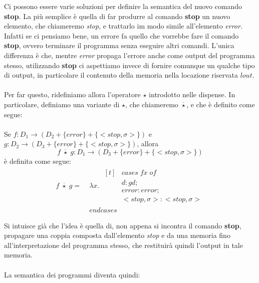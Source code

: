     Ci possono essere varie soluzioni per definire la semantica del nuovo comando \textbf{stop}. La più semplice è quella di far produrre al comando \textbf{stop} un nuovo elemento, che chiameremo \textit{stop}, e trattarlo im modo simile all'elemento \textit{error}. Infatti se ci pensiamo bene, un errore fa quello che vorrebbe fare il comando \textbf{stop}, ovvero terminare il programma senza eseguire altri comandi. L'unica differenza è che, mentre \textit{error} propaga l'errore anche come output del programma stesso, utilizzando \textbf{stop} ci aspettiamo invece di fornire comunque un qualche tipo di output, in particolare il contenuto della memoria nella locazione riservata $lout$.\\
    \\
    Per far questo, ridefiniamo allora l'operatore $\star$ introdotto nelle dispense. In particolare, definiamo una variante di $\star$, che chiameremo $\overline{\star}$, e che è definito come segue:\\
    \\
    Se $f : D_1 \rightarrow (D_2 + \{error\} + \{<stop, \sigma>\})$ e $g : D_2 \rightarrow (D_3 + \{error\} + \{<stop, \sigma>\})$, allora
    \begin{equation*}
        f\; \overline{\star}\; g : D_1 \rightarrow (D_3 + \{error\} + \{<stop, \sigma>\})
    \end{equation*}
    è definita come segue:
    \begin{align*}
        f\; \overline{\star}\; g =\; &\lambda x.\; \begin{aligned}[t]& cases\; fx\; of\\
            & d : gd;\\
            & error : error;\\
            & <stop, \sigma> : <stop, \sigma>
        \end{aligned}\\
        & endcases
    \end{align*}
    
    Si intuisce già che l'idea è quella di, non appena si incontra il comando \textbf{stop}, propagare una coppia composta dall'elemento \textit{stop} e da una memoria fino all'interpretazione del programma stesso, che restituirà quindi l'output in tale memoria.\\
    \\
    La semantica dei programmi diventa quindi:
    
    
